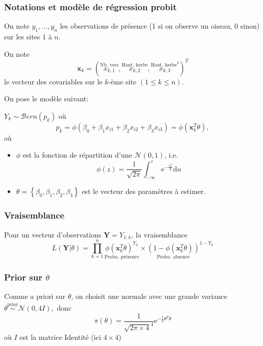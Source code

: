 \documentclass[]{article}
\providecommand{\tightlist}{%
  \setlength{\itemsep}{0pt}\setlength{\parskip}{0pt}}
\begin{document}
\hypertarget{notations-et-moduxe8le-de-ruxe9gression-probit}{%
\subsubsection{Notations et modèle de régression
probit}\label{notations-et-moduxe8le-de-ruxe9gression-probit}}

On note \(y_1, \dots, y_n\) les observations de présence (1 si on
observe un oiseau, 0 sinon) sur les sites \(1\) à \(n\).

On note
\[\mathbf{x}_k = (\overset{\text{Nb. vers}}{x_{k,1}}, \overset{\text{Haut. herbe}}{x_{k,2}}, \overset{\text{Haut. herbe}^2}{x_{k,3}})^T\]
le vecteur des covariables sur le \(k\)-ème site \((1\leq k \leq n)\).

On pose le modèle suivant:

\(Y_k \sim \mathcal{B}ern(p_k)\) où
\[p_k = \phi(\beta_0 + \beta_1 x_{i1} + \beta_2x_{i2} + \beta_3 x_{i3}) = \phi(\mathbf{x}_k^T\theta),\]
où

\begin{itemize}
\tightlist
\item
  \(\phi\) est la fonction de répartition d'une \(\mathcal{N}(0, 1)\),
  i.e.
  \[\phi(z) = \frac{1}{\sqrt{2\pi}}\int_{-\infty}^z \text{e}^{-\frac{u^2}{2}}\text{d}u\]
\item
  \(\theta = \left\lbrace \beta_0, \beta_1, \beta_2, \beta_3\right\rbrace\)
  est le vecteur des paramètres à estimer.
\end{itemize}

\hypertarget{vraisemblance}{%
\subsubsection{Vraisemblance}\label{vraisemblance}}

Pour un vecteur d'observations \(\mathbf{Y} = Y_{1:k}\), la
vraisemblance
\[L(\mathbf{Y}\vert \theta) = \prod_{k = 1}^n \underset{\text{Proba. présence}}{\phi(\mathbf{x}_k^T\theta)^{Y_k}}\times \underset{\text{Proba. absence}}{(1 - \phi(\mathbf{x}_k^T\theta))}^{1 - Y_k}\]

\hypertarget{prior-sur-theta}{%
\subsubsection{\texorpdfstring{Prior sur
\(\theta\)}{Prior sur \textbackslash{}theta}}\label{prior-sur-theta}}

Comme a priori sur \(\theta\), on choisit une normale avec une grande
variance\(\theta \overset{\text{prior}}{\sim} \mathcal{N}(0, 4 I),\)
donc
\[\pi(\theta) = \frac{1}{\sqrt{2\pi \times 4}^4} \text{e}^{-\frac{1}{8}\theta^T\theta}\]
où \(I\) est la matrice Identité (ici \(4 \times 4\))
\end{document}
